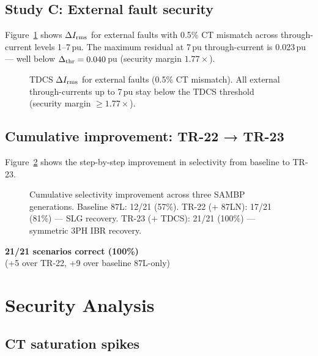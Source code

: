 \documentclass[11pt, a4paper]{article}
\begin{document}
\subsection{Study C: External fault security}

Figure~\ref{fig:security} shows $\Delta I_{\rm rms}$ for external faults
with 0.5\% CT mismatch across through-current levels 1--7\,pu.  The maximum
residual at 7\,pu through-current is 0.023\,pu — well below
$\Delta_{\rm thr} = 0.040$\,pu (security margin $1.77\times$).

\begin{figure}[h]
  \centering
  
  \caption{TDCS $\Delta I_{\rm rms}$ for external faults (0.5\% CT mismatch).
           All external through-currents up to 7\,pu stay below the
           TDCS threshold (security margin $\geq 1.77\times$).}
  \label{fig:security}
\end{figure}

\subsection{Cumulative improvement: TR-22 → TR-23}

Figure~\ref{fig:cumulative} shows the step-by-step improvement in
selectivity from baseline to TR-23.

\begin{figure}[h]
  \centering
  
  \caption{Cumulative selectivity improvement across three SAMBP generations.
           Baseline 87L: 12/21 (57\%).
           TR-22 (+ 87LN): 17/21 (81\%) — SLG recovery.
           TR-23 (+ TDCS): 21/21 (100\%) — symmetric 3PH IBR recovery.}
  \label{fig:cumulative}
\end{figure}

\begin{center}
\Large
\textbf{\textcolor{okgreen}{21/21 scenarios correct (100\%)}}\\[4pt]
\normalsize
(+5 over TR-22, +9 over baseline 87L-only)
\end{center}


\section{Security Analysis}
\label{sec:security}

\subsection{CT saturation spikes}
\end{document}
